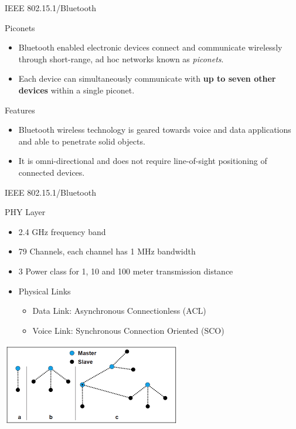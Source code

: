 \documentclass[serif,Blue]{beamer}
\begin{document}
\begin{frame}{IEEE 802.15.1/Bluetooth}
	\begin{block}{Piconets}
		\begin{itemize}\justifying{}
			\item
				Bluetooth enabled electronic devices connect and communicate
				wirelessly through short-range, ad hoc networks known as \emph{piconets}.
			\item
				Each device can simultaneously communicate with \textbf{up to seven other devices} within a
				single piconet.
		\end{itemize}
	\end{block}
	\begin{block}{Features}
		\begin{itemize}\justifying{}
			\item
				Bluetooth wireless technology is geared towards voice and data applications
				and able to penetrate solid objects.
			\item
				It is omni-directional and does not require line-of-sight positioning of connected devices.
		\end{itemize}
	\end{block}
\end{frame}

\begin{frame}{IEEE 802.15.1/Bluetooth}
	\begin{block}{PHY Layer}
		\begin{itemize}\justifying{}
			\item 2.4 GHz frequency band
			\item 79 Channels, each channel has 1 MHz bandwidth
			\item 3 Power class for 1, 10 and 100 meter transmission distance
			\item Physical Links
			\begin{itemize}\justifying{}
				\item Data Link: Asynchronous Connectionless (ACL)
				\item Voice Link: Synchronous Connection Oriented (SCO)
			\end{itemize}
		\end{itemize}
	\end{block}
	\center\includegraphics[scale=.7]{img/btopo.png}
\end{frame}
\end{document}
